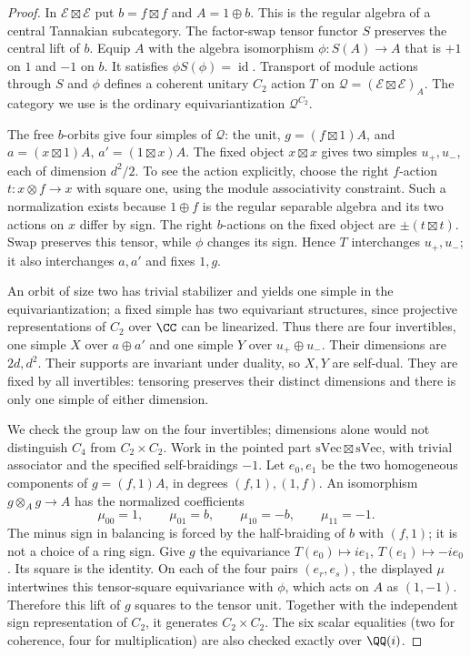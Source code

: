 \begin{proof}
In $\mathcal E\boxtimes\mathcal E$ put $b=f\boxtimes f$ and $A=1\oplus b$.
This is the regular algebra of a central Tannakian subcategory. The
factor-swap tensor functor $S$ preserves the central lift of $b$.
Equip $A$ with the algebra isomorphism $\phi:S(A)\to A$ that is $+1$ on
$1$ and $-1$ on $b$. It satisfies $\phi S(\phi)=\operatorname{id}$.
Transport of module actions through $S$ and $\phi$ defines a coherent
unitary $C_2$ action $T$ on $\mathcal Q=(\mathcal E\boxtimes\mathcal E)_A$.
The category we use is the ordinary equivariantization $\mathcal Q^{C_2}$.

The free $b$-orbits give four simples of $\mathcal Q$: the unit,
$g=(f\boxtimes1)A$, and $a=(x\boxtimes1)A$, $a'=(1\boxtimes x)A$.
The fixed object $x\boxtimes x$ gives two simples $u_+,u_-$, each of
dimension $d^2/2$. To see the action explicitly, choose the right
$f$-action $t:x\otimes f\to x$ with square one, using the module
associativity constraint. Such a normalization exists because
$1\oplus f$ is the regular separable algebra and its two actions on $x$
differ by sign. The right $b$-actions on the fixed object are
$\pm(t\boxtimes t)$. Swap preserves this tensor, while $\phi$ changes its
sign. Hence $T$ interchanges $u_+,u_-$; it also interchanges $a,a'$ and
fixes $1,g$.

An orbit of size two has trivial stabilizer and yields one simple in the
equivariantization; a fixed simple has two equivariant structures, since
projective representations of $C_2$ over $\CC$ can be linearized. Thus
there are four invertibles, one simple $X$ over $a\oplus a'$ and one
simple $Y$ over $u_+\oplus u_-$. Their dimensions are $2d,d^2$.
Their supports are invariant under duality, so $X,Y$ are self-dual.
They are fixed by all invertibles: tensoring preserves their distinct
dimensions and there is only one simple of either dimension.

We check the group law on the four invertibles; dimensions alone would
not distinguish $C_4$ from $C_2\times C_2$. Work in the pointed part
$\mathrm{sVec}\boxtimes\mathrm{sVec}$, with trivial associator and the
specified self-braidings $-1$. Let $e_0,e_1$ be the two homogeneous
components of $g=(f,1)A$, in degrees $(f,1),(1,f)$. An isomorphism
$g\otimes_A g\to A$ has the normalized coefficients
\[
 \mu_{00}=1,\qquad \mu_{01}=b,\qquad
 \mu_{10}=-b,\qquad \mu_{11}=-1.
\]
The minus sign in balancing is forced by the half-braiding of $b$ with
$(f,1)$; it is not a choice of a ring sign. Give $g$ the equivariance
$T(e_0)\mapsto i e_1$, $T(e_1)\mapsto-i e_0$. Its square is the identity.
On each of the four pairs $(e_r,e_s)$, the displayed $\mu$ intertwines
this tensor-square equivariance with $\phi$, which acts on $A$ as
$(1,-1)$. Therefore this lift of $g$ squares to the tensor unit.
Together with the independent sign representation of $C_2$, it generates
$C_2\times C_2$. The six scalar equalities (two for coherence, four for
multiplication) are also checked exactly over $\QQ(i)$.


\end{proof}

